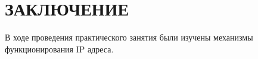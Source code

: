 \section*{ЗАКЛЮЧЕНИЕ}

В ходе проведения практического занятия были изучены механизмы функционирования
IP адреса.

\newpage